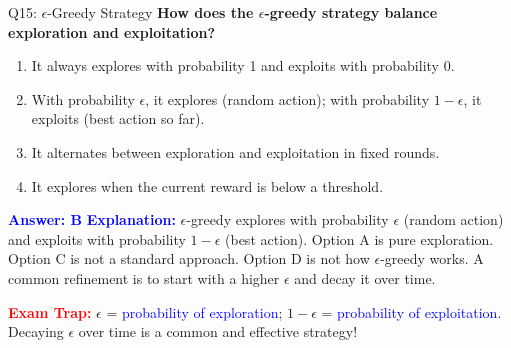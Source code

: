 \documentclass[8pt]{beamer}
\begin{document}
	\begin{frame}{Q15: $\epsilon$-Greedy Strategy}
		\fontsize{6.5}{7.5}\selectfont
		\textbf{How does the $\epsilon$-greedy strategy balance exploration and exploitation?}
		
		\begin{enumerate}
			\item It always explores with probability 1 and exploits with probability 0.
			\item With probability $\epsilon$, it explores (random action); with probability $1-\epsilon$, it exploits (best action so far).
			\item It alternates between exploration and exploitation in fixed rounds.
			\item It explores when the current reward is below a threshold.
		\end{enumerate}
		
		\vspace{0.1cm}
		\textcolor{blue}{\textbf{Answer: B}}
		\vspace{0.1cm}
		\textcolor{blue}{\textbf{Explanation:}} $\epsilon$-greedy explores with probability $\epsilon$ (random action) and exploits with probability $1-\epsilon$ (best action). Option A is pure exploration. Option C is not a standard approach. Option D is not how $\epsilon$-greedy works. A common refinement is to start with a higher $\epsilon$ and decay it over time.
		
		\textcolor{red}{\textbf{Exam Trap:}} $\epsilon$ = \textcolor{blue}{probability of exploration}; $1-\epsilon$ = \textcolor{blue}{probability of exploitation}. Decaying $\epsilon$ over time is a common and effective strategy!
	\end{frame}
	
\end{document}
